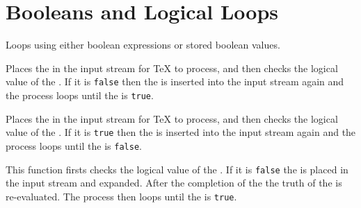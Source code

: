 \documentclass[oneside]{book}
\begin{document}
\section{Booleans and Logical Loops}

Loops using either boolean expressions or stored boolean values.

\begin{function}{\BoolVarDoUntil}
\begin{syntax}
  
\end{syntax}
Places the  in the input stream for \TeX{} to process,
and then checks the logical value of the .  If it is
\texttt{false} then the  is inserted into the input
stream again and the process loops until the  is
\texttt{true}.
\begin{demohigh}
\IgnoreSpacesOn
\BoolSetFalse \lTmpaBool
\IntZero \lTmpaInt
\ClistClear \lTmpaClist
\BoolVarDoUntil {}
\ClistVarJoin \lTmpaClist {:}
\IgnoreSpacesOff
\end{demohigh}
\end{function}

\begin{function}{\BoolVarDoWhile}
\begin{syntax}
  
\end{syntax}
Places the  in the input stream for \TeX{} to process,
and then checks the logical value of the .  If it is
\texttt{true} then the  is inserted into the input
stream again and the process loops until the  is
\texttt{false}.
\begin{demohigh}
\IgnoreSpacesOn
\BoolSetTrue \lTmpaBool
\IntZero \lTmpaInt
\ClistClear \lTmpaClist
\BoolVarDoWhile {}
\ClistVarJoin \lTmpaClist {:}
\IgnoreSpacesOff
\end{demohigh}
\end{function}

\begin{function}{\BoolVarUntilDo}
\begin{syntax}
  
\end{syntax}
This function firsts checks the logical value of the .
If it is \texttt{false} the  is placed in the input stream
and expanded. After the completion of the  the truth
of the  is re-evaluated. The process then loops
until the  is \texttt{true}.
\begin{demohigh}
\IgnoreSpacesOn
\BoolSetFalse \lTmpaBool
\IntZero \lTmpaInt
\ClistClear \lTmpaClist
\BoolVarUntilDo {}
\ClistVarJoin \lTmpaClist {:}
\IgnoreSpacesOff
\end{demohigh}
\end{function}
\end{document}
